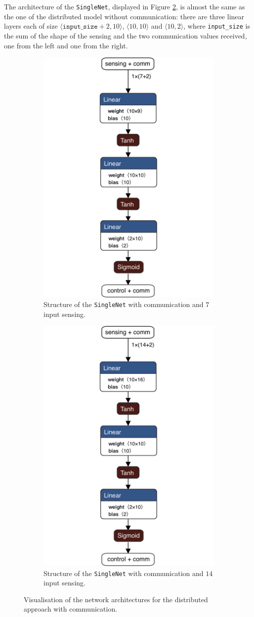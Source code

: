 The architecture of the \texttt{SingleNet}, displayed in Figure 
\ref{fig:singlenetcomm1}, is almost the same as the one of the distributed model 
without communication: there are three linear layers each of size 
$\langle\mathtt{input\_size} + 2, 10\rangle$,  $\langle 10, 
10\rangle$ and $\langle 10, 2\rangle$, where \texttt{input\_size} is the sum of 
the shape of the sensing and the two communication values received, one from 
the left and one from the right.

\begin{figure}[H]
	\centering
	\begin{subfigure}[h]{0.495\textwidth}
		\centering
		\includegraphics[width=.3\textwidth]{contents/images/task1distributedcomm@4x}%
		\caption{Structure of the \texttt{SingleNet} with communication and $7$ 
		input sensing.}
	\end{subfigure}
	\hfill
	\begin{subfigure}[h]{0.495\textwidth}
		\centering
		\includegraphics[width=.3\textwidth]{contents/images/task1distributed_allcomm@4x}
		\caption{Structure of the \texttt{SingleNet} with communication and $14$ 
		input sensing.}
		\label{fig:singlenet14comm1}
	\end{subfigure}
	\caption{Visualisation of the network architectures for the distributed 
		approach with communication.}
	\label{fig:singlenetcomm1}
\end{figure}

